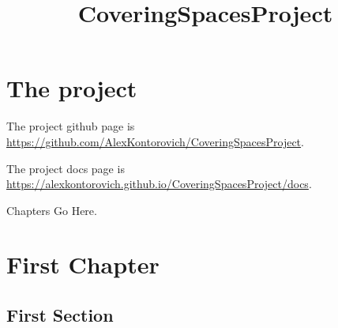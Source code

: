 \usepackage{amsmath, amsthm}
\usepackage{hyperref}

\theoremstyle{definition}
\newtheorem{definition}{Definition}
\newtheorem{theorem}{Theorem}
\newtheorem{proposition}{Proposition}
\newtheorem{lemma}{Lemma}
\newtheorem{corollary}{Corollary}

\title{CoveringSpacesProject}

\newcommand{\eps}{\epsilon}

\newcommand{\R}{\mathbb{R}}
\newcommand{\Q}{\mathbb{Q}}
\newcommand{\C}{\mathbb{C}}
\newcommand{\Z}{\mathbb{Z}}
\newcommand{\N}{\mathbb{N}}



\maketitle

\chapter{The project}

The project github page is \url{https://github.com/AlexKontorovich/CoveringSpacesProject}.

The project docs page is \url{https://alexkontorovich.github.io/CoveringSpacesProject/docs}.

Chapters Go Here.

\chapter{First Chapter}

\section{First Section}



